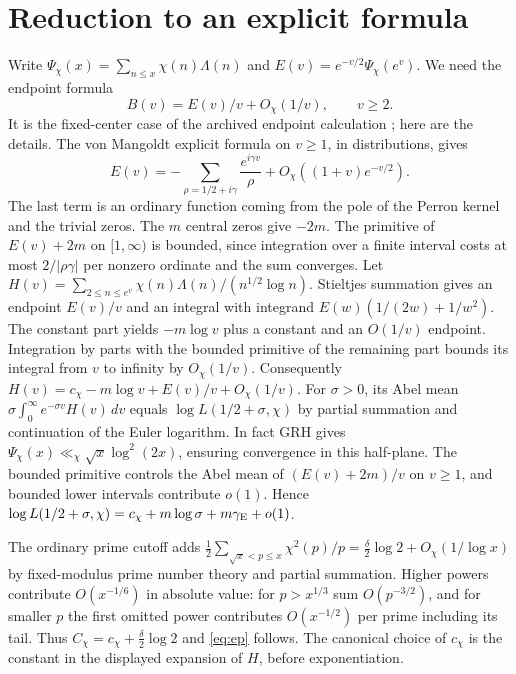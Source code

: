 \documentclass[11pt]{article}
\begin{document}
\section{Reduction to an explicit formula}
Write $\Psi_\chi(x)=\sum_{n\le x}\chi(n)\Lambda(n)$ and
$E(v)=e^{-v/2}\Psi_\chi(e^v)$. We need the endpoint formula
\begin{equation}\label{eq:ep}
 B(v)=E(v)/v+O_\chi(1/v),\qquad v\ge2 .
\end{equation}
It is the fixed-center case of the archived endpoint calculation \cite{in};
here are the details. The von Mangoldt explicit formula on $v\ge1$, in
distributions, gives
\[
 E(v)=-\sum_{\rho=1/2+i\gamma}\frac{e^{i\gamma v}}{\rho}
           +O_\chi((1+v)e^{-v/2}).
\]
The last term is an ordinary function coming from the pole of the Perron
kernel and the trivial zeros. The $m$ central zeros give $-2m$. The
primitive of $E(v)+2m$ on $[1,\infty)$ is bounded, since integration
over a finite interval costs at most $2/|\rho\gamma|$ per nonzero
ordinate and the sum converges. Let
$H(v)=\sum_{2\le n\le e^v}\chi(n)\Lambda(n)/(n^{1/2}\log n)$.
Stieltjes summation gives an endpoint $E(v)/v$ and an integral with
integrand $E(w)(1/(2w)+1/w^2)$. The constant part yields
$-m\log v$ plus a constant and an $O(1/v)$ endpoint. Integration by
parts with the bounded primitive of the remaining part bounds its
integral from $v$ to infinity by $O_\chi(1/v)$. Consequently
$H(v)=c_\chi-m\log v+E(v)/v+O_\chi(1/v)$.
For $\sigma>0$, its Abel mean
$\sigma\int_0^\infty e^{-\sigma v}H(v)\,dv$ equals
$\log L(1/2+\sigma,\chi)$ by partial summation and continuation of the
Euler logarithm. In fact GRH gives $\Psi_\chi(x)\ll_\chi\sqrt{x}\log^2(2x)$,
ensuring convergence in this half-plane. The bounded primitive controls
the Abel mean of $(E(v)+2m)/v$ on $v\ge1$, and bounded lower intervals
contribute $o(1)$. Hence
$\log L(1/2+\sigma,\chi)=c_\chi+m\log\sigma+m\gamma_{\rm E}+o(1)$.

The ordinary prime cutoff adds
$\tfrac12\sum_{\sqrt x<p\le x}\chi^2(p)/p=\tfrac\delta2\log2+
O_\chi(1/\log x)$ by fixed-modulus prime number theory and partial
summation. Higher powers contribute $O(x^{-1/6})$ in absolute value:
for $p>x^{1/3}$ sum $O(p^{-3/2})$, and for smaller $p$ the first
omitted power contributes $O(x^{-1/2})$ per prime including its tail.
Thus $C_\chi=c_\chi+\tfrac\delta2\log2$ and \eqref{eq:ep} follows.
The canonical choice of $c_\chi$ is the constant in the displayed
expansion of $H$, before exponentiation.
\end{document}
